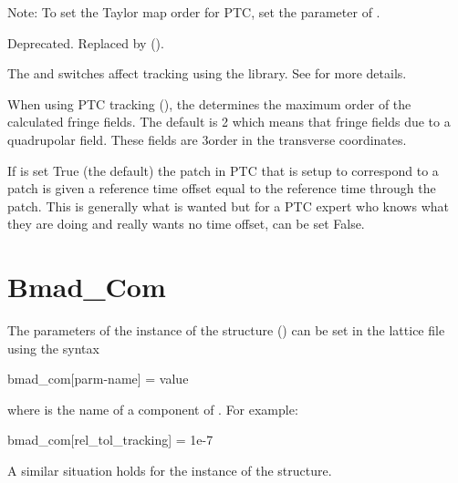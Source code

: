 {Note: To set the Taylor map order for PTC, set the  parameter of .

\begin{description}
%
  \item[{parameter[ptc_exact_model]}] \Newline
Deprecated. Replaced by  ().

The  and  switches affect tracking using the 
library. See  for more details.
%
  \item[{ptc_com[max_fringe_order]}] \Newline
When using PTC tracking (), the  determines
the maximum order of the calculated fringe fields. The default is 2 which means that fringe fields
due to a quadrupolar field. These fields are 3\Rd order in the transverse coordinates.
%
  \item[{ptc_com[translate_patch_drift_time]}] \Newline
If  is set True (the default) the patch in PTC that is setup to
correspond to a \bmad patch is given a reference time offset equal to the \bmad reference time
through the patch. This is generally what is wanted but for a PTC expert who knows what they are
doing and really wants no time offset,  can be set False.
  \end{description}

\section{Bmad_Com}
\label{s:bmad.ptc.com}

The parameters of the  instance of the  structure
() can be set in the lattice file using the syntax
\begin{example}
  bmad_com[parm-name] = value
\end{example}
where  is the name of a component of
. For example:
\begin{example}
  bmad_com[rel_tol_tracking] = 1e-7
\end{example}

A similar situation holds for the  instance of the  structure.

}
